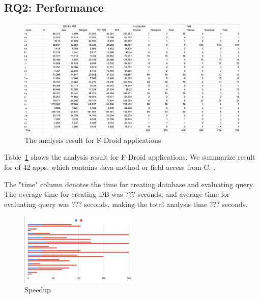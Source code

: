 \subsection{RQ2: Performance}
\begin{figure}[t]
  \centering
  \vspace{2mm}
  \includegraphics[width=\textwidth]{img/table2}
  \vspace*{-1.5em}
  \caption{The analysis result for F-Droid applications}
  \label{fig:table2}
\vspace*{-.5em}
\end{figure}

Table~\ref{fig:table2} shows the analysis result for F-Droid applications. We summarize
result for  of 42 apps, which contains Java method or field access
from C. .

The "time" column denotes the time for creating database and evaluating query.
The average time for creating DB was ??? seconds, and average time for
evaluating query was ???  seconds, making the total analysis time ??? seconds.

\begin{figure}[t]
  \centering
  \vspace{2mm}
  \includegraphics[width=0.5\textwidth]{img/graph}
  \vspace*{-1.5em}
  \caption{Speedup}
  \label{fig:graph}
\vspace*{-.5em}
\end{figure}

